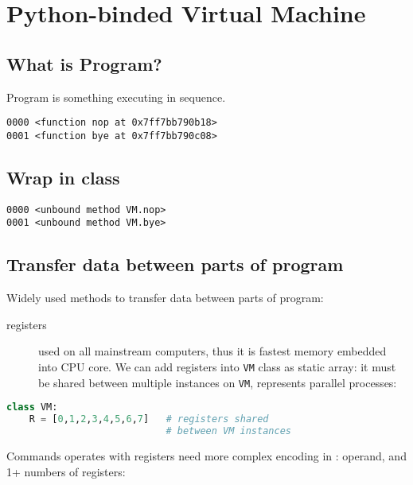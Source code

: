 \chapter{Python-binded Virtual Machine}
\clearpage

\section{What is Program?}

Program is something executing in sequence.


\begin{lstlisting}
0000 <function nop at 0x7ff7bb790b18>
0001 <function bye at 0x7ff7bb790c08>
\end{lstlisting}

\section{Wrap in class}


\begin{lstlisting}
0000 <unbound method VM.nop>
0001 <unbound method VM.bye>
\end{lstlisting}

\section{Transfer data between parts of program}

Widely used methods to transfer data between parts of program:
\begin{description}
\item[registers] used on all mainstream computers, thus it is fastest memory
embedded into CPU core.
We can add registers into \verb|VM| class as static array: it must be shared
between multiple instances on \verb|VM|, represents parallel processes:
\end{description}

\begin{lstlisting}[language=Python]
class VM:
    R = [0,1,2,3,4,5,6,7]	# registers shared
    						# between VM instances
\end{lstlisting} 

Commands operates with registers need more complex encoding in : operand, and 1+ numbers of registers:

